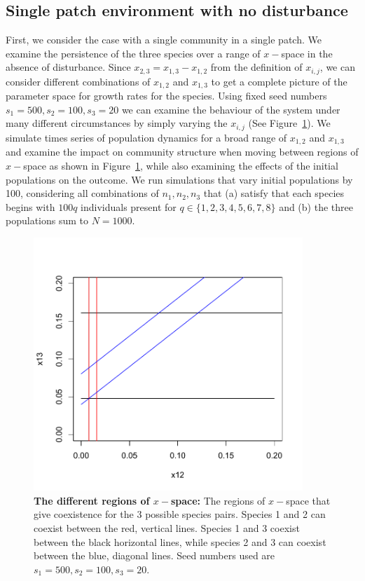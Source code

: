 \subsection{Single patch environment with no disturbance}
First, we consider the case with a single community in a single patch. We examine the persistence of the three species over a range of $x-$space in the absence of disturbance. Since $x_{2,3}=x_{1,3}-x_{1,2}$ from the definition of $x_{i,j}$, we can consider different combinations of 
$x_{1,2}$ and $x_{1,3}$ to get a complete picture of the parameter space for growth rates for the species. Using fixed seed numbers $s_1=500,s_2=100,s_3=20$ we can examine the behaviour of the system under many different circumstances by simply varying the $x_{i,j}$ (See Figure~\ref{xregions}). We simulate times series of population dynamics for a broad range of $x_{1,2}$ and $x_{1,3}$ and examine the impact on community structure when moving between regions of $x-$space as shown in Figure~\ref{xregions}, while also examining the effects of the initial populations on the outcome. We run simulations that vary initial populations by 100, considering all combinations of $n_1,n_2,n_3$ that (a) satisfy that each species begins with $100q$ individuals present for $q \in \{1,2,3,4,5,6,7,8\}$ and (b) the three populations sum to $N=1000$. 
\begin{figure}[htbp]
\begin{center}
\includegraphics[width=4in]{3dxchoices.pdf}
\caption[The different regions of $x-$space]{\textbf{The different regions of $x-$space:} The regions of $x-$space that give coexistence for the 3 possible species pairs. Species 1 and 2 can coexist between the red, vertical lines. Species 1 and 3 coexist between the black horizontal lines, while species 2 and 3 can coexist between the blue, diagonal lines. Seed numbers used are $s_1=500,s_2=100,s_3=20$.}
\label{xregions}
\end{center}
\end{figure}
